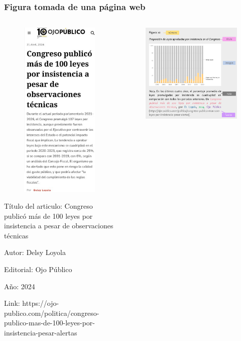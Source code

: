 \documentclass[
11pt, %
]{beamer}
\begin{document}
\begin{frame}
	\frametitle{Figura tomada de una página web}

	\begin{columns}[c] %
		\begin{column}{0.5\textwidth} %
			\begin{figure}
				\centering
				\includegraphics[width=0.2\linewidth]{images/screenshot011}
			\end{figure}
			\scriptsize{

				Título del articulo: Congreso publicó más de 100 leyes por insistencia a pesar
				de observaciones técnicas

				Autor: Delsy Loyola

				Editorial: Ojo Público

				Año: 2024

				Link:
				https://ojo-publico.com/politica/congreso-publico-mas-de-100-leyes-por-insistencia-pesar-alertas}

		\end{column}
		\begin{column}{0.5\textwidth} %
			\begin{figure}
				\centering
				\includegraphics[width=1\linewidth]{images/screenshot012}
			\end{figure}


\end{column}
\end{columns}
\end{frame}
\end{document}
